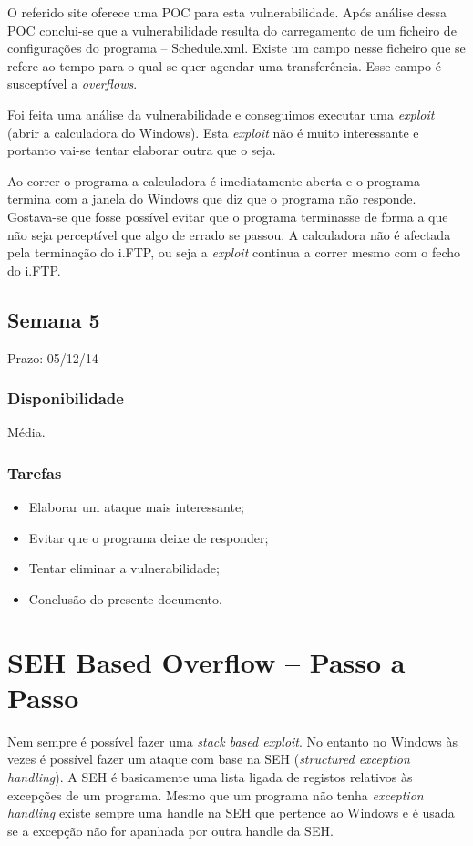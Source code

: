 \documentclass[a4paper]{article}
\begin{document}
O referido site oferece uma POC para esta vulnerabilidade. Após análise dessa POC conclui-se que a vulnerabilidade resulta do carregamento de um ficheiro de configurações do programa -- Schedule.xml. Existe um campo nesse ficheiro que se refere ao tempo para o qual se quer agendar uma transferência. Esse campo é susceptível a \textit{overflows}.

Foi feita uma análise da vulnerabilidade e conseguimos executar uma \textit{exploit} (abrir a calculadora do Windows). Esta \textit{exploit} não é muito interessante e portanto vai-se tentar elaborar outra que o seja.

Ao correr o programa a calculadora é imediatamente aberta e o programa termina com a janela do Windows que diz que o programa não responde. Gostava-se que fosse possível evitar que o programa terminasse de forma a que não seja perceptível que algo de errado se passou. A calculadora não é afectada pela terminação do i.FTP, ou seja a \textit{exploit} continua a correr mesmo com o fecho do i.FTP.


\subsection{Semana 5}
Prazo: 05/12/14
\subsubsection{Disponibilidade}
Média.
\subsubsection{Tarefas}
\begin{itemize}
	\item Elaborar um ataque mais interessante;
	\item Evitar que o programa deixe de responder;
	\item Tentar eliminar a vulnerabilidade;
	\item Conclusão do presente documento.
\end{itemize}


\section{SEH Based Overflow -- Passo a Passo}

Nem sempre é possível fazer uma \textit{stack based exploit}. No entanto no Windows às vezes é possível fazer um ataque com base na SEH (\textit{structured exception handling}). A SEH é basicamente uma lista ligada de registos relativos às excepções de um programa. Mesmo que um programa não tenha \textit{exception handling} existe sempre uma handle na SEH que pertence ao Windows e é usada se a excepção não for apanhada por outra handle da SEH.
\end{document}
